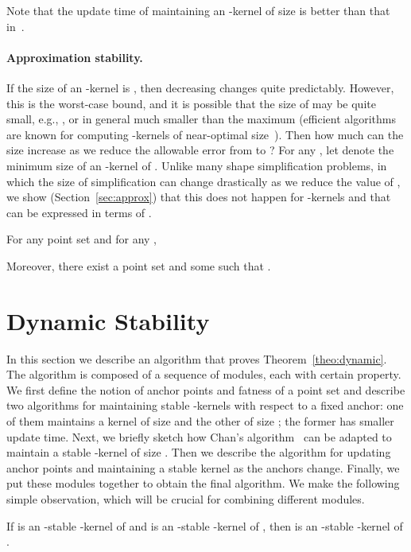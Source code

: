 \documentclass[11pt]{myclass}
\begin{document}
Note that the update time of maintaining an
-kernel of size  is better than
that in~\cite{Cha08}.
\paragraph{Approximation stability.}
If the size of an -kernel  is ,
 then decreasing  changes  quite predictably.
However, this is the worst-case bound, and
it is possible that the size of  may be quite small, e.g.,
, or in general much smaller than the  maximum
(efficient algorithms are known for computing
-kernels of near-optimal size~\cite{AHV07}).  Then 
how much can the size increase as we reduce the allowable
error from  to ?  
For any , let  denote the minimum size of an  
-kernel of . 
Unlike many shape simplification problems, in which the size of
simplification can change drastically as we reduce the value
of , we show (Section~\ref{sec:approx}) that 
this does not happen for -kernels and that
 can be expressed in terms of . 

\begin{theorem}
\label{theo:approx}
    For any point set  and for any , 
    
Moreover, there exist a point set  and some  such that 
   .
\end{theorem}


\section{Dynamic Stability}
\label{sec:dynamic}

In this section we describe an algorithm that proves 
Theorem~\ref{theo:dynamic}. The algorithm is composed of a sequence of 
modules, each with certain property.  
We first define the notion of anchor points and fatness of a 
point set and describe two algorithms for maintaining 
stable -kernels with respect to a fixed anchor:
one of them maintains a kernel of size  and the other 
of size ; the former has smaller update time.
Next, we briefly sketch how Chan's algorithm~\cite{Cha08} can be adapted to maintain a stable -kernel of size . 
Then we describe the algorithm for updating anchor points and 
maintaining a stable kernel as the anchors change. Finally, we put these 
modules together to obtain the final algorithm.
We make the following simple observation, which will be crucial for combining different modules.

\begin{lemma}
If  is an -stable -kernel of  and  is an -stable -kernel of , then  is an -stable -kernel of .
\label{lem:chain}
\end{lemma}
\end{document}
